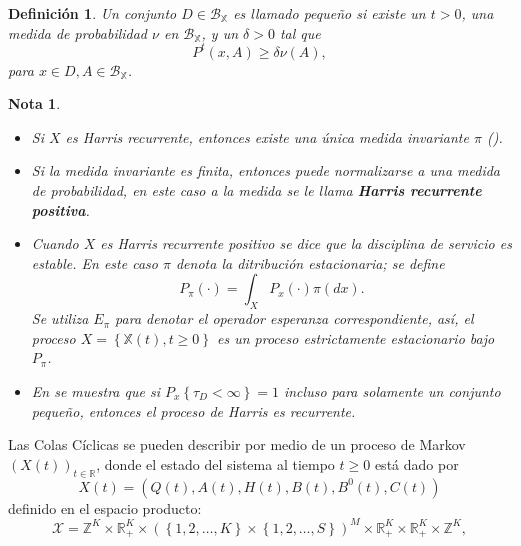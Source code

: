 \documentclass{article}
\newtheorem{Def}{Definición}
\newtheorem{Note}{Nota}
\newcommand{\rea}{\mathbb{R}}
\begin{document}
\begin{Def}
Un conjunto $D\in\mathcal{B}_\mathbb{X}$ es llamado peque\~no si existe un $t>0$, una medida de probabilidad $\nu$ en $\mathcal{B}_\mathbb{X}$, y un $\delta>0$ tal que \[P^{t}\left(x,A\right)\geq\delta\nu\left(A\right),\] para $x\in D,A\in\mathcal{B}_\mathbb{X}$.
\end{Def}
\begin{Note}
\begin{itemize}

\item[i)] Si $X$ es Harris recurrente, entonces existe una \'unica medida invariante $\pi$ (\cite{Getoor}).

\item[ii)] Si la medida invariante es finita, entonces puede normalizarse a una medida de probabilidad, en este caso a la medida se le llama \textbf{Harris recurrente positiva}.

\item[iii)] Cuando $X$ es Harris recurrente positivo se dice que la disciplina de servicio es estable. En este caso $\pi$ denota la ditribuci\'on estacionaria; se define \[P_{\pi}\left(\cdot\right)=\int_{X}P_{x}\left(\cdot\right)\pi\left(dx\right).\] Se utiliza $E_{\pi}$ para denotar el operador esperanza
correspondiente, as\'i, el proceso $X=\left\{\mathbb{X}\left(t\right),t\geq0\right\}$ es un proceso estrictamente estacionario bajo $P_{\pi}$.

\item[iv)] En \cite{MeynTweedie} se muestra que si $P_{x}\left\{\tau_{D}<\infty\right\}=1$ incluso para solamente un conjunto peque\~no, entonces el proceso de Harris es recurrente.
\end{itemize}
\end{Note}


Las Colas C\'iclicas se pueden describir por medio de un proceso de Markov $\left(X\left(t\right)\right)_{t\in\rea}$, donde el estado del sistema al tiempo $t\geq0$ est\'a dado por
\begin{equation}
X\left(t\right)=\left(Q\left(t\right),A\left(t\right),H\left(t\right),B\left(t\right),B^{0}\left(t\right),C\left(t\right)\right)
\end{equation}
definido en el espacio producto:
\begin{equation}
\mathcal{X}=\mathbb{Z}^{K}\times\rea_{+}^{K}\times\left(\left\{1,2,\ldots,K\right\}\times\left\{1,2,\ldots,S\right\}\right)^{M}\times\rea_{+}^{K}\times\rea_{+}^{K}\times\mathbb{Z}^{K},
\end{equation}
\end{document}
